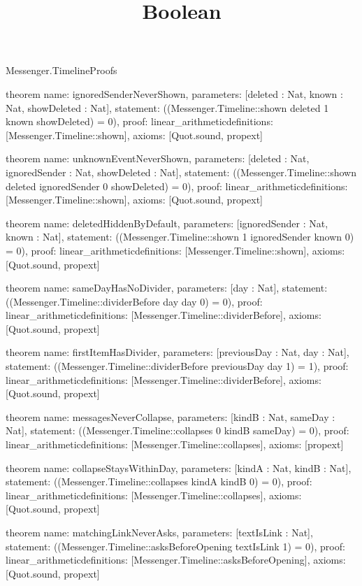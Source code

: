 \begin{lexlean}{Messenger.TimelineProofs}
\title{Boolean}
\begin{semanticmodule}
theorem{
  name: ignoredSenderNeverShown,
  parameters: [deleted : Nat, known : Nat, showDeleted : Nat],
  statement: ((Messenger.Timeline::shown deleted 1 known showDeleted) = 0),
  proof: linear_arithmetic{definitions: [Messenger.Timeline::shown]},
  axioms: [Quot.sound, propext]
}

theorem{
  name: unknownEventNeverShown,
  parameters: [deleted : Nat, ignoredSender : Nat, showDeleted : Nat],
  statement: ((Messenger.Timeline::shown deleted ignoredSender 0 showDeleted) = 0),
  proof: linear_arithmetic{definitions: [Messenger.Timeline::shown]},
  axioms: [Quot.sound, propext]
}

theorem{
  name: deletedHiddenByDefault,
  parameters: [ignoredSender : Nat, known : Nat],
  statement: ((Messenger.Timeline::shown 1 ignoredSender known 0) = 0),
  proof: linear_arithmetic{definitions: [Messenger.Timeline::shown]},
  axioms: [Quot.sound, propext]
}

theorem{
  name: sameDayHasNoDivider,
  parameters: [day : Nat],
  statement: ((Messenger.Timeline::dividerBefore day day 0) = 0),
  proof: linear_arithmetic{definitions: [Messenger.Timeline::dividerBefore]},
  axioms: [Quot.sound, propext]
}

theorem{
  name: firstItemHasDivider,
  parameters: [previousDay : Nat, day : Nat],
  statement: ((Messenger.Timeline::dividerBefore previousDay day 1) = 1),
  proof: linear_arithmetic{definitions: [Messenger.Timeline::dividerBefore]},
  axioms: [Quot.sound, propext]
}

theorem{
  name: messagesNeverCollapse,
  parameters: [kindB : Nat, sameDay : Nat],
  statement: ((Messenger.Timeline::collapses 0 kindB sameDay) = 0),
  proof: linear_arithmetic{definitions: [Messenger.Timeline::collapses]},
  axioms: [propext]
}

theorem{
  name: collapseStaysWithinDay,
  parameters: [kindA : Nat, kindB : Nat],
  statement: ((Messenger.Timeline::collapses kindA kindB 0) = 0),
  proof: linear_arithmetic{definitions: [Messenger.Timeline::collapses]},
  axioms: [Quot.sound, propext]
}

theorem{
  name: matchingLinkNeverAsks,
  parameters: [textIsLink : Nat],
  statement: ((Messenger.Timeline::asksBeforeOpening textIsLink 1) = 0),
  proof: linear_arithmetic{definitions: [Messenger.Timeline::asksBeforeOpening]},
  axioms: [Quot.sound, propext]
}


\end{semanticmodule}
\end{lexlean}
